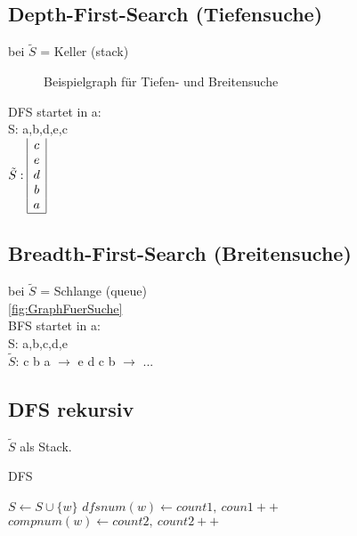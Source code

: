 					\subsection{Depth-First-Search (Tiefensuche)}
						bei $\tilde S$ = Keller (stack)\\
						\begin{figure}
							\centering
							
							\label{fig:GraphFuerSuche}
							\caption{Beispielgraph für Tiefen- und Breitensuche}
						\end{figure}
						DFS startet in a:\\
						S: a,b,d,e,c\\
						\hspace*{2cm}$\tilde S:\begin{array}{|c|}
							c\\e\\d\\b\\a\\\hline
						\end{array}$
					
					\subsection{Breadth-First-Search (Breitensuche)}
						bei $\tilde S$ = Schlange (queue)\\
						\autoref{fig:GraphFuerSuche}\\
						BFS startet in a:\\
						S: a,b,c,d,e\\
						$\tilde S$: c b a $\rightarrow$ e d c b $\rightarrow$ ...
					
					
					\subsection{DFS rekursiv}
					    $\tilde S$ als Stack.
					    \begin{algorithm}
					    		\caption{DFS}
					    		\begin{algorithmic}
					    						\State $S\gets S\cup \{w\}$
					    						\State $dfsnum(w)\gets count1,\ coun1++$
					    						\State {} 
					    						\State {}
					    						\State $compnum(w)\gets count2,\ count2++$					    						
					    					\Else
					    							\State{} 
					    						\Else
					    								\State{} 
					    							\Else
					    								\State{} 
					    							\EndIf
					    						\EndIf
					    					\EndIf
					    				\EndFor
					    			\EndFunction
					    		\end{algorithmic}
					    \end{algorithm}

